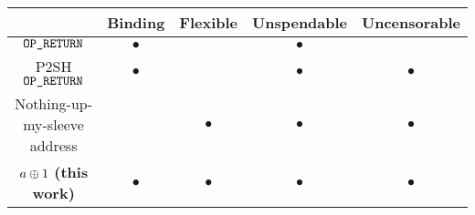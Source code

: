 \begin{center}
    \newcommand{\y}{$\bullet$}
    \newcommand{\n}{}
    \begin{tabular}{ |c|c|c|c|c| }
     \hline
                                        & Binding & Flexible & Unspendable & Uncensorable \\
     \hline
     $\texttt{OP\_RETURN}$                         & \y      & \n       & \y          & \n \\
     P2SH $\texttt{OP\_RETURN}$                    & \y      & \n       & \y          & \y \\
     Nothing-up-my-sleeve address       & \n      & \y       & \y          & \y \\
     $a \oplus 1$ \textbf{(this work)}    & \y      & \y       & \y          & \y \\
     \hline
    \end{tabular}
\end{center}
